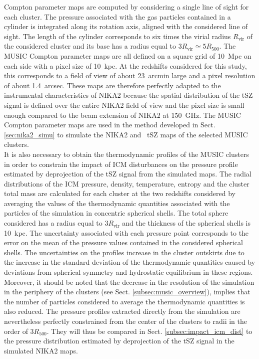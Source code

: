 \documentclass[twocolumn,traditabstract]{aa}
\begin{document}
Compton parameter maps are computed by considering a single line of sight for each cluster. The pressure associated with the gas particles contained in a cylinder is integrated along its rotation axis, aligned with the considered line of sight. The length of the cylinder corresponds to six times the virial radius $R_{\mathrm{vir}}$ of the considered cluster and its base has a radius equal to $3R_{\mathrm{vir}} \simeq 5R_{500}$. The MUSIC Compton parameter maps are all defined on a square grid of 10~Mpc on each side with a pixel size of 10~kpc. At the redshifts considered for this study, this corresponds to a field of view of about 23~arcmin large and a pixel resolution of about 1.4~arcsec. These maps are therefore perfectly adapted to the instrumental characteristics of NIKA2 because the spatial distribution of the tSZ signal is defined over the entire NIKA2 field of view and the pixel size is small enough compared to the beam extension of NIKA2 at 150~GHz. The MUSIC Compton parameter maps are used in the method developed in Sect. \ref{sec:nika2_simu} to simulate the NIKA2 and \planck\ tSZ maps of the selected MUSIC clusters.\\

It is also necessary to obtain the thermodynamic profiles of the MUSIC clusters in order to constrain the impact of ICM disturbances on the pressure profile estimated by deprojection of the tSZ signal from the simulated maps. The radial distributions of the ICM pressure, density, temperature, entropy and the cluster total mass are calculated for each cluster at the two redshifts considered by averaging the values of the thermodynamic quantities associated with the particles of the simulation in concentric spherical shells. The total sphere considered has a radius equal to $3R_{\mathrm{vir}}$ and the thickness of the spherical shells is 10~kpc. The uncertainty associated with each pressure point corresponds to the error on the mean of the pressure values contained in the considered spherical shells. The uncertainties on the profiles increase in the cluster outskirts due to the increase in the standard deviation of the thermodynamic quantities caused by deviations from spherical symmetry and hydrostatic equilibrium in these regions. Moreover, it should be noted that the decrease in the resolution of the simulation in the periphery of the clusters (see Sect. \ref{subsec:music_overview}), implies that the number of particles considered to average the thermodynamic quantities is also reduced. The pressure profiles extracted directly from the simulation are nevertheless perfectly constrained from the center of the clusters to radii in the order of $3R_{500}$. They will thus be compared in Sect. \ref{subsec:impact_icm_dist} to the pressure distribution estimated by deprojection of the tSZ signal in the simulated NIKA2 maps.
\end{document}

